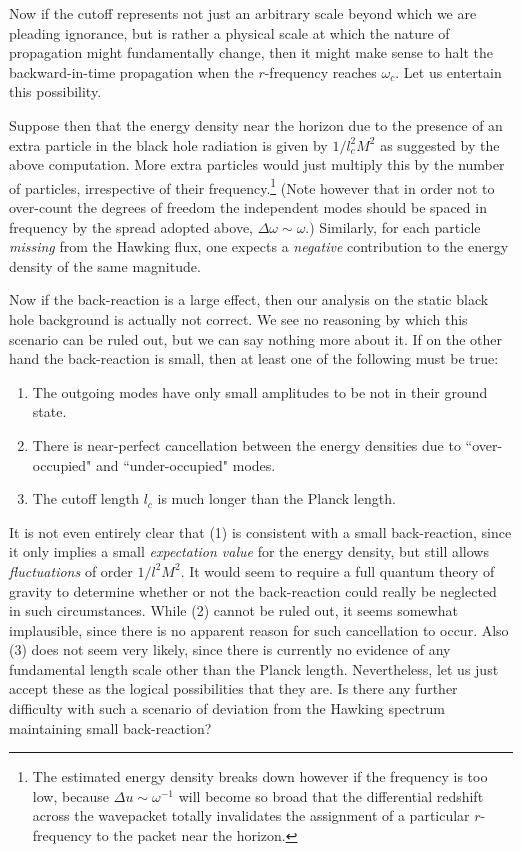\documentclass[12pt]{article}
\def\o{\omega}
\begin{document}
Now if the cutoff represents not just an arbitrary scale
beyond which we are pleading ignorance, but is rather a
physical scale at which the nature of propagation might
fundamentally change, then it might make sense to halt the
backward-in-time propagation when the $r$-frequency reaches
$\o_c$. Let us entertain this possibility.

Suppose then that the energy density near the horizon due to
the presence of an extra particle in the black hole
radiation is given by $1/l_c^2M^2$ as suggested by the
above computation. More extra particles would just multiply
this by the number of particles, irrespective of their
frequency.\footnote{The estimated energy density breaks down
however if the frequency is too low, because $\Delta u\sim
\o^{-1}$ will become so broad that the differential redshift
across the wavepacket totally invalidates the assignment of
a particular $r$-frequency to the packet near the horizon.}
(Note however that in order not to over-count
the degrees of freedom the independent modes should be spaced in
frequency by the spread adopted above, $\Delta\o\sim\o$.)
Similarly, for each particle {\it missing} from the Hawking
flux, one expects a {\it negative} contribution to the
energy density of the same magnitude.

Now if the back-reaction is a large effect, then our
analysis on the static black hole background is actually not
correct. We see no reasoning by which this scenario can be
ruled out, but we can say nothing more about it.
If on the other hand the back-reaction is small, then at least one of the
following must be true:
\begin{enumerate}
\item The outgoing modes have only small amplitudes to
be not in their ground state.
\item There is near-perfect cancellation between the
energy densities due to ``over-occupied" and
``under-occupied" modes.
\item The cutoff length $l_c$ is much longer than the
Planck length.
\end{enumerate}

It is not even entirely clear that (1) is consistent with a small
back-reaction, since it only implies a small {\it expectation
value} for the energy density, but still allows {\it
fluctuations} of order $1/l^2M^2$. It would seem to require
a full quantum theory of gravity to determine whether or not the
back-reaction could really be neglected in such circumstances.
While (2) cannot be ruled out, it seems somewhat implausible,
since there is no apparent reason for such cancellation to
occur. Also (3) does not seem very likely,
since there is currently no evidence of any
fundamental length scale other than the Planck length.
Nevertheless, let us just accept
these as the logical possibilities that they are. Is there
any further difficulty with such a scenario of deviation
from the Hawking spectrum maintaining small back-reaction?
\end{document}
